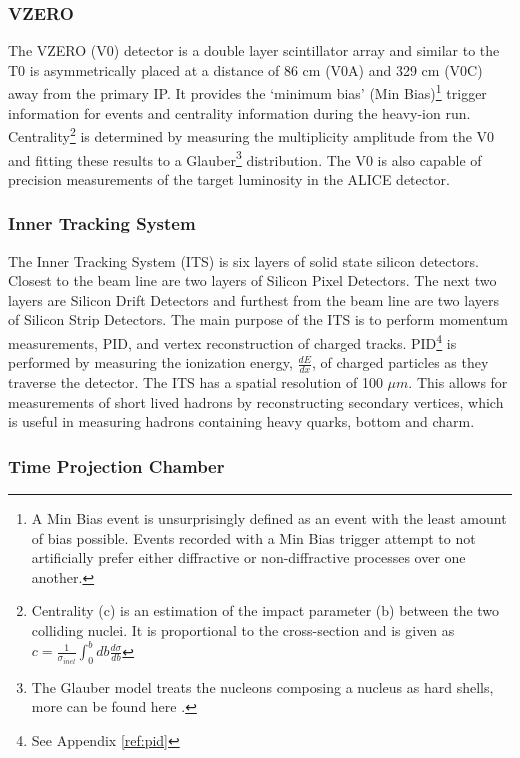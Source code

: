 \subsubsection{VZERO}
The VZERO (V0)\cite{Abbas:2013taa} detector is a double layer scintillator array and similar to the T0 is asymmetrically placed at a distance of 86 cm (V0A) and 329 cm (V0C) away from the primary IP.  It provides the `minimum bias' (Min Bias)\footnote{A Min Bias event is unsurprisingly defined as an event with the least amount of bias possible.  Events recorded with a Min Bias trigger attempt to not artificially prefer either diffractive or non-diffractive processes over one another\cite{Field:2011iq}.} trigger information for events and centrality information during the heavy-ion run.   Centrality\footnote{Centrality (c) is an estimation of the impact parameter (b) between the two colliding nuclei.  It is proportional to the cross-section and is given as $c = \frac{1}{\sigma_{inel}} \int^{b}_{0} db \frac{d\sigma}{db}$} is determined by measuring the multiplicity amplitude from the V0 and fitting these results to a Glauber\footnote{The Glauber model treats the nucleons composing a nucleus as hard shells, more can be found here \cite{Loizides:2016djv}.} distribution.  The V0 is also capable of precision measurements of the target luminosity in the ALICE detector.


\subsubsection{Inner Tracking System}\label{sec:its}
The Inner Tracking System (ITS)\cite{BEOLE20121062} is six layers of solid state silicon detectors.  Closest to the beam line are two layers of Silicon Pixel Detectors.  The next two layers are Silicon Drift Detectors and furthest from the beam line are two layers of Silicon Strip Detectors.  The main purpose of the ITS is to perform momentum measurements, PID, and vertex reconstruction of charged tracks.  PID\footnote{See Appendix \ref{ref:pid}} is performed by measuring the ionization energy, $\frac{dE}{dx}$, of charged particles as they traverse the detector\cite{Adam:2016acv}.  The ITS has a spatial resolution of 100 $\mu m$.  This allows for measurements of short lived hadrons by reconstructing secondary vertices, which is useful in measuring hadrons containing heavy quarks, bottom and charm.



\subsubsection{Time Projection Chamber}\label{sec:tpc}

